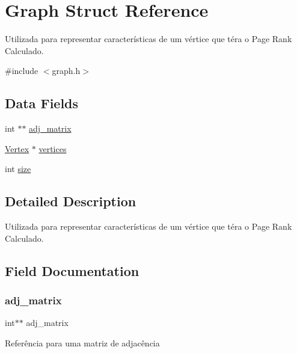 \hypertarget{struct_graph}{}\section{Graph Struct Reference}
\label{struct_graph}


Utilizada para representar características de um vértice que téra o Page Rank Calculado.  




{\ttfamily \#include $<$graph.\+h$>$}

\subsection*{Data Fields}
\begin{DoxyCompactItemize}
\item 
int $\ast$$\ast$ \mbox{\hyperlink{struct_graph_a31eb01960342fb2962159e33c93415ed}{adj\+\_\+matrix}}
\item 
\mbox{\hyperlink{struct_vertex}{Vertex}} $\ast$ \mbox{\hyperlink{struct_graph_aa184fcb106f77d0014446ed6844db369}{vertices}}
\item 
int \mbox{\hyperlink{struct_graph_a439227feff9d7f55384e8780cfc2eb82}{size}}
\end{DoxyCompactItemize}


\subsection{Detailed Description}
Utilizada para representar características de um vértice que téra o Page Rank Calculado. 

\subsection{Field Documentation}
\mbox{\label{struct_graph_a31eb01960342fb2962159e33c93415ed}} 
\subsubsection{\texorpdfstring{adj\_matrix}{adj\_matrix}}
{\footnotesize\ttfamily int$\ast$$\ast$ adj\+\_\+matrix}

Referência para uma matriz de adjacência \mbox{\label{struct_graph_a439227feff9d7f55384e8780cfc2eb82}} 
